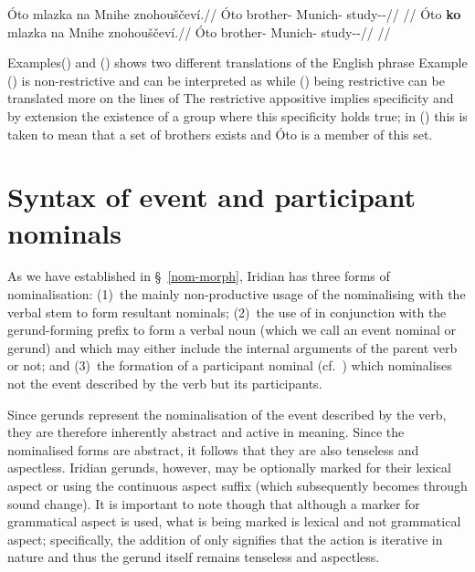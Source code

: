 \pex\a
\begingl{}
    \gla \'Oto mlazka na Mnihe znohouščeví.//
    \glb  \'Oto brother-\Dim{} \Loc{} Munich-\Pat{} study-\Av{}-\Cont{}//
    \glft {}//
\endgl
\a\begingl{}
    \gla \'Oto \textbf{ko} mlazka na Mnihe znohouščeví.//
    \glb  \'Oto \Lnk{} brother-\Dim{} \Loc{} Munich-\Pat{} study-\Av{}-\Cont{}//
    \glft {}//
\endgl
\xe

Examples() and () shows two different translations of the English phrase  Example () is non-restrictive and can be interpreted as  while () being restrictive can be translated more on the lines of  The restrictive appositive implies specificity and by extension the existence of a group where this specificity holds true; in () this is taken to mean that a set of brothers exists and \'Oto is a member of this set.


\section{Syntax of event and participant nominals}\label{sec:nomz-syntax}

As we have established in \S~\ref{nom-morph}, Iridian has three forms of nominalisation: (1)~the mainly non-productive usage of the nominalising  with the verbal stem to form resultant nominals; (2)~the use of  in conjunction with the gerund-forming prefix  to form a verbal noun (which we call an event nominal or gerund) and which may either include the internal arguments of the parent verb or not; and (3)~the formation of a participant nominal (cf.~\cite{okuna}) which nominalises not the event described by the verb but its participants.

Since gerunds represent the nominalisation of the event described by the verb, they are therefore inherently abstract and active in meaning. Since the nominalised forms are abstract, it follows that they are also tenseless and aspectless. Iridian gerunds, however, may be optionally marked for their lexical aspect or  using the continuous aspect suffix  (which subsequently becomes  through sound change). It is important to note though that although a marker for grammatical aspect is used, what is being marked is lexical and not grammatical aspect; specifically, the addition of  only signifies that the action is iterative in nature and thus the gerund itself remains tenseless and aspectless.

